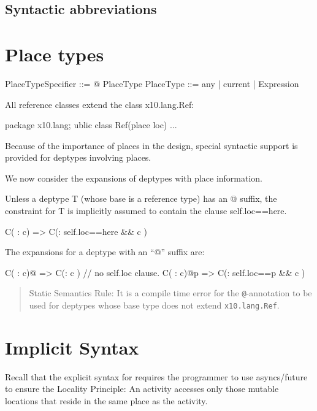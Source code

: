 \subsection{Syntactic abbreviations}\label{DepType:SyntaxAbbrev}

\section{Place types}\label{DepType:PlaceType}

\begin{x10}
PlaceTypeSpecifier ::= @ PlaceType
PlaceType ::=  any | current | Expression  
\end{x10}

All \Xten{} reference classes extend the class x10.lang.Ref:

\begin{x10}
package x10.lang;
ublic class Ref(place loc) { ... }  
\end{x10}

Because of the importance of places in the \Xten{} design, special
syntactic support is provided for deptypes involving places.

We now consider the expansions of deptypes with place information.

Unless a deptype {\cf T} (whose base is a reference type) has an {\cf @} suffix,
the constraint for {\cf T} is implicitly assumed to contain the clause
{\cf self.loc==here}.
\begin{x10}
C( : c) => C(: self.loc==here \&\& c )  
\end{x10}
\noindent The expansions for a deptype with an ``{\cf @}'' suffix are:
\begin{x10}
C( : c)@  => C(: c )  // no self.loc clause.
C( : c)@p => C(: self.loc==p \&\& c ) 
\end{x10}


\begin{quotation}
  {\cf Static Semantics Rule:} It is a compile time error for the {\tt @}-annotation to
  be used for deptypes whose base type does not extend {\tt x10.lang.Ref}.  
\end{quotation}

\section{Implicit Syntax}\label{ImplicitSyntax}

Recall that the explicit syntax for \Xten{} requires the programmer to use
asyncs/future to ensure the Locality Principle: An activity accesses
only those mutable locations that reside in the same place as the
activity. 

